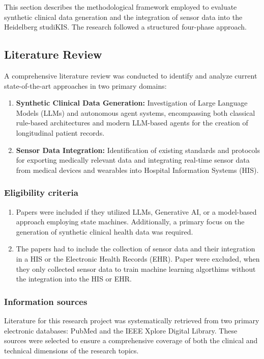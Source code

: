 \label{sec:methods}

This section describes the methodological framework employed to evaluate synthetic clinical data generation and the integration of sensor data into the Heidelberg studiKIS. The research followed a structured four-phase approach.

\subsection*{Literature Review}
A comprehensive literature review was conducted to identify and analyze current state-of-the-art approaches in two primary domains:
\begin{enumerate}
    \item \textbf{Synthetic Clinical Data Generation:} Investigation of Large Language Models (LLMs) and autonomous agent systems, encompassing both classical rule-based architectures and modern LLM-based agents for the creation of longitudinal patient records.
    \item \textbf{Sensor Data Integration:} Identification of existing standards and protocols for exporting medically relevant data and integrating real-time sensor data from medical devices and wearables into Hospital Information Systems (HIS).
\end{enumerate}
\subsubsection*{Eligibility criteria}

\begin{enumerate}
    \item Papers were included if they utilized LLMs, Generative AI, or a model-based approach employing state machines. Additionally, a primary focus on the generation of synthetic clinical health data was required.
    \item The papers had to include the collection of sensor data and their integration in a HIS or the Electronic Health Records (EHR). Paper were excluded, when they only collected sensor data to train machine learning algorthims without the integration into the HIS or EHR.
\end{enumerate}
\subsubsection*{Information sources}
Literature for this research project was systematically retrieved from two primary electronic databases: PubMed and the IEEE Xplore Digital Library. These sources were selected to ensure a comprehensive coverage of both the clinical and technical dimensions of the research topics.

